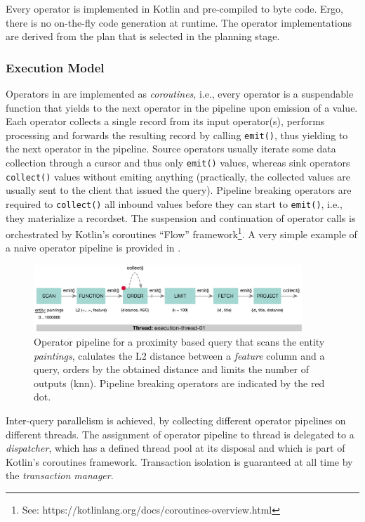 Every operator is implemented in Kotlin and pre-compiled to byte code. Ergo, there is no on-the-fly code generation at runtime. The operator implementations are derived from the plan that is selected in the planning stage.

\subsubsection{Execution Model}

Operators in \cottontail{} are implemented as \emph{coroutines}, i.e., every operator is a suspendable function that yields to the next operator in the pipeline upon emission of a value. Each operator collects a single record from its input operator(s), performs processing and forwards the resulting record by calling \texttt{emit()}, thus yielding to the next operator in the pipeline. Source operators usually iterate some data collection through a cursor and thus only \texttt{emit()} values, whereas sink operators \texttt{collect()} values without emiting anything (practically, the collected values are usually sent to the client that issued the query). Pipeline breaking operators are required to \texttt{collect()} all inbound values before they can start to \texttt{emit()}, i.e., they materialize a recordset. The suspension and continuation of operator calls is orchestrated by Kotlin's coroutines ``Flow'' framework\footnote{See: https://kotlinlang.org/docs/coroutines-overview.html}. A very simple example of a naive operator pipeline is provided in .

\begin{figure}[bt]
    \centering
    \includegraphics[width=0.9\textwidth]{figures/execution-model-simple}
    \caption{Operator pipeline for a proximity based query that scans the entity \emph{paintings}, calulates the L2 distance between a \emph{feature} column and a query, orders by the obtained distance and limits the number of outputs (\acrshort{knn}). Pipeline breaking operators are indicated by the red dot.}
    \label{figure:cottontail_execution_model_simple}
\end{figure}

Inter-query parallelism is achieved, by collecting different operator pipelines on different threads. The assignment of operator pipeline to thread is delegated to a \emph{dispatcher}, which has a defined thread pool at its disposal and which is part of Kotlin's coroutines framework. Transaction isolation is guaranteed at all time by the \emph{transaction manager}.

